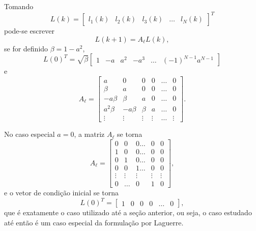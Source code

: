 Tomando
%
\begin{equation}
	\label{eq:laguerre-L}
	L(k) = \begin{bmatrix}
		l_1(k)   &
		l_2(k)   &
		l_3(k)   &
		\hdots{} &
		l_N(k)
	\end{bmatrix}^T
\end{equation}
%
pode-se escrever
%
\begin{equation}
	L(k+1) = A_\ell{}L(k),
\end{equation}
%
se for definido \(\beta{}=1-a^2\),
%
\begin{equation}
	{L(0)}^{T} = \sqrt{\beta}\begin{bmatrix}
		1 & -a & a^2 & -a^3 & \hdots{} & {(-1)}^{N-1}a^{N-1}
	\end{bmatrix}
\end{equation}
%
e
%
\begin{equation}
	A_\ell{} = \begin{bmatrix}
		a          & 0         & 0        & 0        & \hdots{} & 0        \\
		\beta{}    & a         & 0        & 0        & \hdots{} & 0        \\
		-a\beta{}  & \beta{}   & a        & 0        & \hdots{} & 0        \\
		a^2\beta{} & -a\beta{} & \beta{}  & a        & \hdots{} & 0        \\
		\vdots{}   & \vdots{}  & \vdots{} & \vdots{} & \hdots{} & \vdots{}
	\end{bmatrix}.
\end{equation}

No caso especial \(a=0\), a matriz \(A_\ell{}\) se torna
%
\begin{equation}
	A_\ell{} = \begin{bmatrix}
		0        & 0        & 0 \hdots{} & 0        & 0        \\
		1        & 0        & 0 \hdots{} & 0        & 0        \\
		0        & 1        & 0 \hdots{} & 0        & 0        \\
		0        & 0        & 1 \hdots{} & 0        & 0        \\
		\vdots{} & \vdots{} & \vdots{}   & \vdots{} & \vdots{} \\
		0        & \hdots{} & 0          & 1        & 0
	\end{bmatrix},
\end{equation}
%
e o vetor de condição inicial se torna
%
\begin{equation}
	{L(0)}^{T} = \begin{bmatrix}
		1 & 0 & 0 & 0 & \hdots{} & 0
	\end{bmatrix},
\end{equation}
%
que é exatamente o caso utilizado até a seção anterior, ou seja, o caso estudado
até então é um caso especial da formulação por Laguerre.

